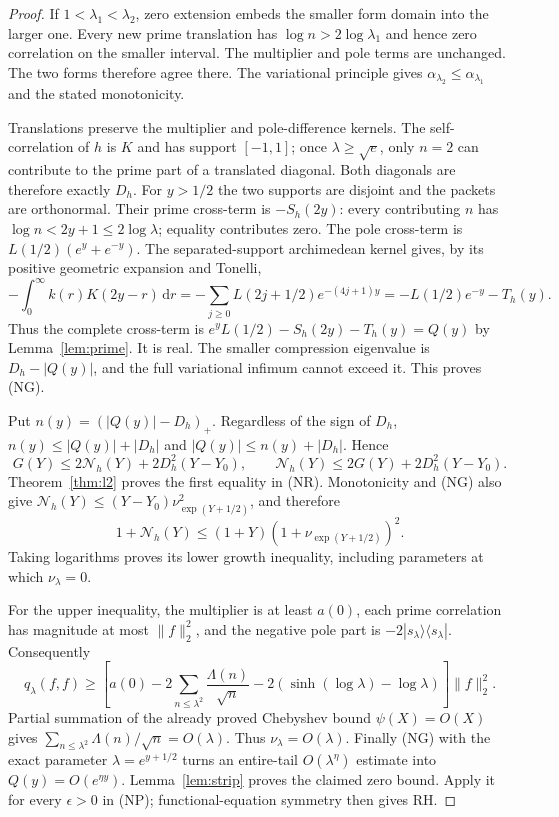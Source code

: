 \documentclass[11pt]{article}
\theoremstyle{remark}\newtheorem{remark}[theorem]{Remark}
\newcommand{\dd}{\,\mathrm d}
\begin{document}
\begin{proof}
If $1<\lambda_1<\lambda_2$, zero extension embeds the smaller
form domain into the larger one. Every new prime translation has
$\log n>2\log\lambda_1$ and hence zero correlation on the smaller
interval. The multiplier and pole terms are unchanged.
The two forms therefore agree there. The variational principle
gives $\alpha_{\lambda_2}\le\alpha_{\lambda_1}$ and the stated
monotonicity.

Translations preserve the multiplier and pole-difference kernels.
The self-correlation of $h$ is $K$ and has support $[-1,1]$;
once $\lambda\ge\sqrt e$, only $n=2$ can contribute to the
prime part of a translated diagonal. Both diagonals are therefore
exactly $D_h$. For $y>1/2$ the two supports are disjoint and the
packets are orthonormal. Their prime cross-term is
$-S_h(2y)$: every contributing $n$ has
$\log n<2y+1\le2\log\lambda$; equality contributes zero.
The pole cross-term is $L(1/2)(e^y+e^{-y})$.
The separated-support archimedean kernel gives, by its positive
geometric expansion and Tonelli,
\[
 -\int_0^\infty k(r)K(2y-r)\dd r
 =-\sum_{j\ge0}L(2j+1/2)e^{-(4j+1)y}
 =-L(1/2)e^{-y}-T_h(y).
\]
Thus the complete cross-term is
$e^yL(1/2)-S_h(2y)-T_h(y)=Q(y)$ by
Lemma~\ref{lem:prime}. It is real. The smaller compression
eigenvalue is $D_h-|Q(y)|$, and the full variational infimum
cannot exceed it. This proves (NG).

Put $n(y)=(|Q(y)|-D_h)_+$. Regardless of the sign of $D_h$,
$n(y)\le |Q(y)|+|D_h|$ and $|Q(y)|\le n(y)+|D_h|$.
Hence
\[
 G(Y)\le2\mathcal N_h(Y)+2D_h^2(Y-Y_0),\qquad
 \mathcal N_h(Y)\le2G(Y)+2D_h^2(Y-Y_0).
\]
Theorem~\ref{thm:l2} proves the first equality in (NR).
Monotonicity and (NG) also give
$\mathcal N_h(Y)\le(Y-Y_0)\nu_{\exp(Y+1/2)}^2$,
and therefore
\[
 1+\mathcal N_h(Y)\le(1+Y)(1+\nu_{\exp(Y+1/2)})^2.
\]
Taking logarithms proves its lower growth inequality, including
parameters at which $\nu_\lambda=0$.

For the upper inequality, the multiplier is at least $a(0)$,
each prime correlation has magnitude at most $\|f\|_2^2$,
and the negative pole part is $-2|s_\lambda\rangle
\langle s_\lambda|$. Consequently
\[
 q_\lambda(f,f)\ge
 \left[a(0)-2\sum_{n\le\lambda^2}\frac{\Lambda(n)}{\sqrt n}
                -2(\sinh(\log\lambda)-\log\lambda)\right]\|f\|_2^2.
\]
Partial summation of the already proved Chebyshev bound
$\psi(X)=O(X)$ gives
$\sum_{n\le\lambda^2}\Lambda(n)/\sqrt n=O(\lambda)$.
Thus $\nu_\lambda=O(\lambda)$.
Finally (NG) with the exact parameter $\lambda=e^{y+1/2}$
turns an entire-tail $O(\lambda^\eta)$ estimate into
$Q(y)=O(e^{\eta y})$. Lemma~\ref{lem:strip} proves the
claimed zero bound. Apply it for every $\epsilon>0$ in (NP);
functional-equation symmetry then gives RH.
\end{proof}
\end{document}
